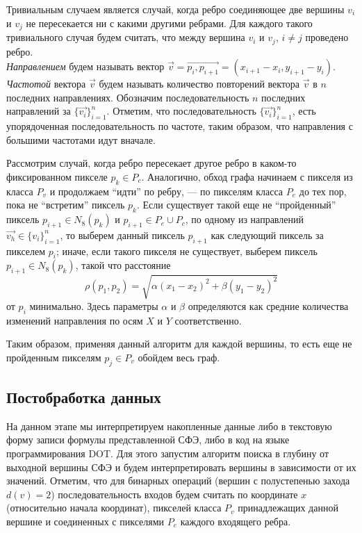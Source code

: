\documentclass[makeidx, a4paper, 14pt]{extarticle}
\begin{document}
Тривиальным случаем является случай, когда ребро соединяющее две вершины $v_i$ и $v_j$ не пересекается ни с какими другими ребрами.
Для каждого такого тривиального случая будем считать, что между вершина $v_i$ и $v_j$, ${i \neq j}$ проведено ребро. \\

\emph{Направлением} будем называть вектор $\vec{v}=\overrightarrow{p_i,p_{i+1}}=(x_{i+1}-x_i, y_{i+1}-y_i)$.
\emph{Частотой} вектора $\vec{v}$ будем называть количество повторений вектора $\vec{v}$ в $n$ последних направлениях.
Обозначим последовательность $n$ последних направлений за $\{\vec{v_i}\}_{i=1}^{n}$.
Отметим, что последовательность $\{\vec{v_i}\}_{i=1}^{n}$, есть упорядоченная последовательность по частоте,
таким образом, что направления с большими частотами идут вначале.

Рассмотрим случай, когда ребро пересекает другое ребро в каком-то фиксированном пикселе $p_k \in P_c$.
Аналогично, обход графа начинаем с пикселя из класса $P_v$ и продолжаем ``идти'' по ребру, --- по пикселям класса $P_e$ до тех пор,
пока не ``встретим'' пиксель $p_k$. Если существует такой еще не ``пройденный'' пиксель $p_{i+1} \in N_8(p_k)$ и $p_{i+1} \in P_e \cup P_c$,
по одному из направлений $\vec{v_h} \in \{v_i\}_{i=1}^{n}$, то выберем данный пиксель $p_{i+1}$ как следующий пиксель за пикселем $p_i$;
иначе, если такого пикселя не существует, выберем пиксель $p_{i+1} \in N_8(p_k)$, такой что расстояние \[\rho(p_1, p_2) = \sqrt{\alpha(x_1-x_2)^2+\beta(y_1-y_2)^2}\]
от $p_i$ минимально. Здесь параметры $\alpha$ и $\beta$ определяются как средние количества изменений направления по осям $X$ и $Y$ соответственно.

Таким образом, применяя данный алгоритм для каждой вершины, то есть еще не пройденным пикселям $p_j \in P_v$ обойдем весь граф.

\subsection{Постобработка данных}
На данном этапе мы интерпретируем накопленные данные либо в текстовую форму записи формулы представленной СФЭ, либо в
код на языке программирования DOT. Для этого запустим алгоритм поиска в глубину \cite{dfs} от выходной вершины СФЭ и будем
интерпретировать вершины в зависимости от их значений. Отметим, что для бинарных операций (вершин с полустепенью захода $d(v) = 2$) последовательность входов будем считать по координате $x$ (относительно начала координат),
пикселей класса $P_v$ принадлежащих данной вершине и соединенных с пикселями $P_e$ каждого входящего ребра.
\end{document}
